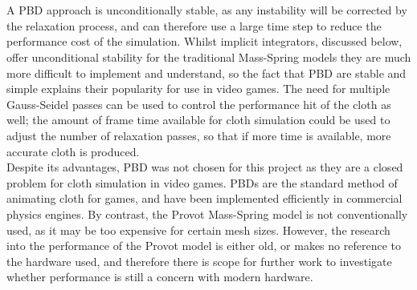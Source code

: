 \\\\A PBD approach is unconditionally stable, as any instability will be corrected by the relaxation process, and can therefore use a large time step to reduce the performance cost of the simulation. Whilst implicit integrators, discussed below, offer unconditional stability for the traditional Mass-Spring models they are much more difficult to implement and understand, so the fact that PBD are stable and simple explains their popularity for use in video games. The need for multiple Gauss-Seidel passes can be used to control the performance hit of the cloth as well; the amount of frame time available for cloth simulation could be used to adjust the number of relaxation passes, so that if more time is available, more accurate cloth is produced.
\\Despite its advantages, PBD was not chosen for this project as they are a closed problem for cloth simulation in video games. PBDs are the standard method of animating cloth for games, and have been implemented efficiently in commercial physics engines. By contrast, the Provot Mass-Spring model is not conventionally used, as it may be too expensive for certain mesh sizes. However, the research into the performance of the Provot model is either old, or makes no reference to the hardware used, and therefore there is scope for further work to investigate whether performance is still a concern with modern hardware.

